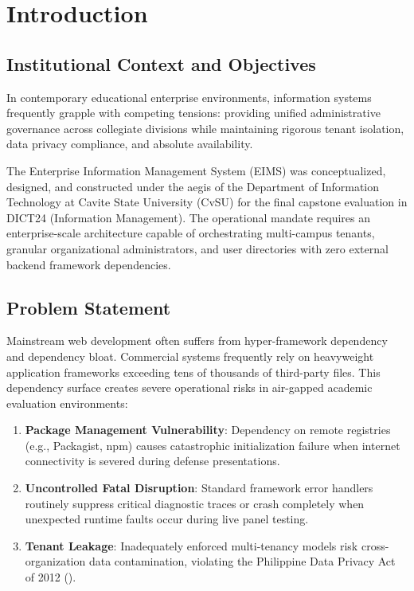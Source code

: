 \section{Introduction}

\subsection{Institutional Context and Objectives}
In contemporary educational enterprise environments, information systems frequently grapple with competing tensions: providing unified administrative governance across collegiate divisions while maintaining rigorous tenant isolation, data privacy compliance, and absolute availability.

The Enterprise Information Management System (EIMS) was conceptualized, designed, and constructed under the aegis of the Department of Information Technology at Cavite State University (CvSU) for the final capstone evaluation in DICT24 (Information Management). The operational mandate requires an enterprise-scale architecture capable of orchestrating multi-campus tenants, granular organizational administrators, and user directories with zero external backend framework dependencies.

\subsection{Problem Statement}
Mainstream web development often suffers from hyper-framework dependency and dependency bloat. Commercial systems frequently rely on heavyweight application frameworks exceeding tens of thousands of third-party files. This dependency surface creates severe operational risks in air-gapped academic evaluation environments:
\begin{enumerate}
    \item \textbf{Package Management Vulnerability}: Dependency on remote registries (e.g., Packagist, npm) causes catastrophic initialization failure when internet connectivity is severed during defense presentations.
    \item \textbf{Uncontrolled Fatal Disruption}: Standard framework error handlers routinely suppress critical diagnostic traces or crash completely when unexpected runtime faults occur during live panel testing.
    \item \textbf{Tenant Leakage}: Inadequately enforced multi-tenancy models risk cross-organization data contamination, violating the Philippine Data Privacy Act of 2012 (\cite{ra10173}).
\end{enumerate}

